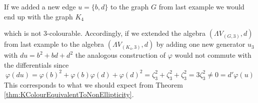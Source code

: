 \begin{Remark}
 If we added a new edge $ u = \lbrace b,d \rbrace$ to the graph $G$ from last example we would end up with the graph $K_4$ 
 \begin{center}
    

   \end{center}

 which
 is not $3$-colourable. Accordingly, if we extended the algebra $(\Lambda V_{(G,3)},d)$ from last example to the algebra
 $(\Lambda V_{(K_4,3)}, d)$ by adding one new generator $u_3$ with $du = b^2 + bd + d^2$ the analogous construction of $\varphi$ would
 not commute with the differentials since
 $$ \varphi(du) = \varphi(b)^2 + \varphi(b)\varphi(d) + \varphi(d)^2 = \zeta_3^2 + \zeta_3^2 + \zeta_3^2 = 3 \zeta_3^2 
 \neq 0 = d' \varphi(u)$$ 
 This corresponds to what we should expect from Theorem \ref{thm:KColourEquivalentToNonEllipticity}.
\end{Remark}

